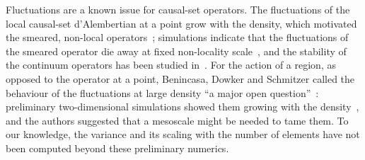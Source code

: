 \documentclass{iopjournal}
\begin{document}
Fluctuations are a known issue for causal-set operators. The fluctuations of
the local causal-set d'Alembertian at a point grow with the density, which
motivated the smeared, non-local operators~\cite{Sorkin2007,Benincasa2010};
simulations indicate that the fluctuations of the smeared operator die away
at fixed non-locality scale~\cite{Benincasa2010,Belenchia2016c}, and the
stability of the continuum operators has been studied
in~\cite{Aslanbeigi2014}. For the action of a region, as
opposed to the operator at a point, Benincasa, Dowker and Schmitzer called the
behaviour of the fluctuations at large density ``a major open
question''~\cite{Benincasa2011}: preliminary two-dimensional simulations
showed them growing with the density~\cite{Schmitzer2010}, and the authors
suggested that a mesoscale might be needed to tame them. To our knowledge,
the variance and its scaling with the number of elements have not been
computed beyond these preliminary numerics.
\end{document}
